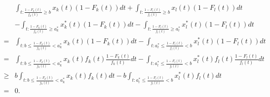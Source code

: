 \documentclass[10pt,final,journal,letterpaper]{IEEEtran}
\begin{document}
\begin{figure*}[!t]
\normalsize
\begin{align}
\label{app2_eq1}
&\int_{t:\frac{1-F_k(t)}{f_k(t)}\geq b}x_k(t)(1-F_k(t))dt+\int_{t:\frac{1-F_l(t)}{f_l(t)}\geq b}x_l(t)(1-F_l(t))dt\nonumber\\
    &-\int_{t:\frac{1-F_k(t)}{f_k(t)}\geq a_k^{\ast}}x_k^{\ast}(t)(1-F_k(t))dt-\int_{t:\frac{1-F_l(t)}{f_l(t)}\geq a_l^{\ast}}x_l^{\ast}(t)(1-F_l(t))dt\nonumber\\
    =&\int_{t:b\leq\frac{1-F_k(t)}{f_k(t)}<a_k^{\ast}}x_k(t)(1-F_k(t))dt-\int_{t:a_l^{\ast}\leq\frac{1-F_l(t)}{f_l(t)}<b}x_l^{\ast}(t)(1-F_l(t))dt\nonumber\\
    =&\int_{t:b\leq\frac{1-F_k(t)}{f_k(t)}<a_k^{\ast}}x_k(t)f_k(t)\frac{1-F_k(t)}{f_k(t)}dt-\int_{t:a_l^{\ast}\leq\frac{1-F_l(t)}{f_l(t)}<b}x_l^{\ast}(t)f_l(t)\frac{1-F_l(t)}{f_l(t)}dt\nonumber\\
    \geq &b\int_{t:b\leq\frac{1-F_k(t)}{f_k(t)}<a_k^{\ast}}x_k(t)f_k(t)dt-b\int_{t:a_l^{\ast}\leq\frac{1-F_l(t)}{f_l(t)}<b}x_l^{\ast}(t)f_l(t)dt\nonumber\\
    =&0.
\end{align}
\hrulefill
\vspace*{4pt}
\end{figure*}
\end{document}
